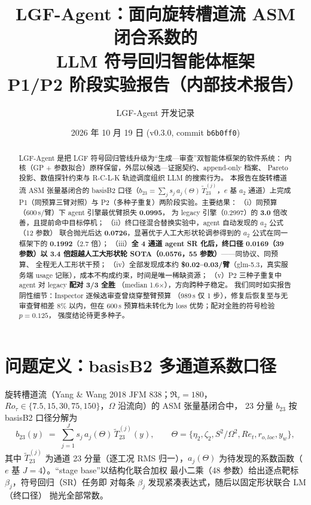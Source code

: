 \documentclass[11pt,a4paper]{ctexart}
\title{\textbf{LGF-Agent：面向旋转槽道流 ASM 闭合系数的\\ LLM 符号回归智能体框架}\\[6pt]
\large P1/P2 阶段实验报告（内部技术报告）}
\author{LGF-Agent 开发记录}
\date{2026 年 10 月 19 日 \; (v0.3.0, commit \texttt{b6b0ff0})}
\newcommand{\rol}{r_{o,loc}}
\newcommand{\yw}{y_w}
\newcommand{\et}{\eta_2}
\newcommand{\zt}{\zeta_2}
\newcommand{\ret}{Re_t}
\begin{document}
\maketitle

\begin{abstract}
LGF-Agent 是把 LGF 符号回归管线升级为``生成—审查''双智能体框架的软件系统：
内核（GP + 参数拟合）原样保留，外层以候选—证据契约、append-only 档案、
Pareto 投影、数值探针约束与 R-C-L-K 轨迹调度组织 LLM 的搜索行为。
本报告在旋转槽道流 ASM 张量基闭合的 basisB2 口径（$b_{23}=\sum_j s_j\,a_j(\Theta)\,
\tilde T^{(j)}_{23}$，$e$ 基 $a_2$ 通道）上完成 P1（同预算三臂对照）与
P2（多种子重复）两阶段实验。主要结果：
（i）同预算（600\,s/臂）下 agent 引擎最优臂损失 \textbf{0.0995}，
为 legacy 引擎（0.2997）的 \textbf{3.0} 倍改善，且提前命中目标停机；
（ii）终口径混合替换实验中，agent 自动发现的 $a_2$ 公式（12 参数）
联合抛光后达 \textbf{0.0726}，显著优于人工大形状轮调参得到的
$a_2$ 公式在同一框架下的 \textbf{0.1992}（2.7 倍）；
（iii）\textbf{全 4 通道 agent SR 化后，终口径 0.0169（39 参数）以
3.4 倍超越人工大形状轮 SOTA（0.0576，55 参数）}——同协议、同预算、
全程无人工形状干预；
（iv）全部发现成本约 \textbf{\$0.02--0.03/臂}（glm-5.3，真实服务端
usage 记账），成本不构成约束，时间是唯一稀缺资源；
（v）P2 三种子重复中 agent 对 legacy \textbf{配对 3/3 全胜}
（median 1.6$\times$），方向跨种子稳定。
我们同时如实报告阴性细节：Inspector 逐候选审查曾烧穿整臂预算
（989\,s 仅 1 步），修复后恢复至与无审查臂相差 8\% 以内，但在 600\,s
预算档未转化为 loss 优势；配对全胜的符号检验 $p=0.125$，
强度结论待更多种子。
\end{abstract}

\tableofcontents

\section{问题定义：basisB2 多通道系数口径}

旋转槽道流（Yang \& Wang 2018 JFM 838；$\Re_\tau=180$，
$Ro_\tau\in\{7.5,15,30,75,150\}$，$\Omega$ 沿流向）的 ASM 张量基闭合中，
23 分量 $b_{23}$ 按 basisB2 口径分解为
\begin{equation}
  b_{23}(y) \;=\; \sum_{j=1}^{J} s_j\, a_j(\Theta)\,\tilde T^{(j)}_{23}(y),
  \qquad
  \Theta = \{\et,\zt,S^2\!/\Omega^2,\ret,\rol,\yw\},
\end{equation}
其中 $\tilde T^{(j)}_{23}$ 为通道 23 分量（逐工况 RMS 归一），$a_j(\Theta)$
为待发现的系数函数（$e$ 基 $J{=}4$）。``stage base''以结构化联合加权
最小二乘（48 参数）给出逐点靶标 $\beta_j$，符号回归（SR）任务即
对每条 $\beta_j$ 发现紧凑表达式，随后以固定形状联合 LM（终口径）
抛光全部常数。
\end{document}
